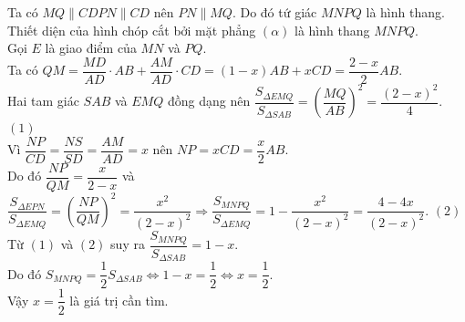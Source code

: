 \begin{ex}
{		Ta có $MQ\parallel CD PN\parallel CD$ nên $PN\parallel MQ$. Do đó tứ giác $MNPQ$ là hình  thang.\\
		Thiết diện của hình  chóp cắt bởi mặt phẳng $\left(\alpha\right)$ là hình thang $MNPQ$.\\
		Gọi $E$  là giao điểm của $MN$ và $PQ$.\\
		Ta có $QM=\dfrac{MD}{AD}\cdot  AB+\dfrac{AM}{AD}\cdot CD=\left(1-x\right)AB+xCD=\dfrac{2-x}{2}AB$.\\
		Hai tam giác $SAB$ và $EMQ$ đồng dạng nên $\dfrac{S_{\Delta EMQ}}{S_{\Delta SAB}}=\left(\dfrac{MQ}{AB}\right)^2=\dfrac{\left(2-x\right)^2}{4}$.  $\left(1\right)$\\
		 Vì $\dfrac{NP}{CD}=\dfrac{NS}{SD}=\dfrac{AM}{AD}=x$ nên $NP=xCD=\dfrac{x}{2}AB$.\\
		Do đó $\dfrac{NP}{QM}=\dfrac{x}{2-x}$  và
		$\dfrac{S_{\Delta EPN}}{S_{\Delta EMQ}}=\left(\dfrac{NP}{QM}\right)^2=\dfrac{x^2}{\left(2-x\right)^2}\Rightarrow  \dfrac{S_{MNPQ}}{S_{\Delta EMQ}}=1-\dfrac{x^2}{\left(2-x\right)^2}=\dfrac{4-4x}{\left(2-x\right)^2}$. $\left(2\right)$\\
		Từ $\left(1\right)$  và $\left(2\right)$ suy ra $\dfrac{S_{MNPQ}}{S_{\Delta SAB}}=1-x$.\\
		Do đó $S_{MNPQ}=\dfrac{1}{2}S_{\Delta SAB}\Leftrightarrow  1-x=\dfrac{1}{2}\Leftrightarrow x=\dfrac{1}{2}$.\\
	Vậy  $x=\dfrac{1}{2}$ là giá trị cần tìm.}
\end{ex}

